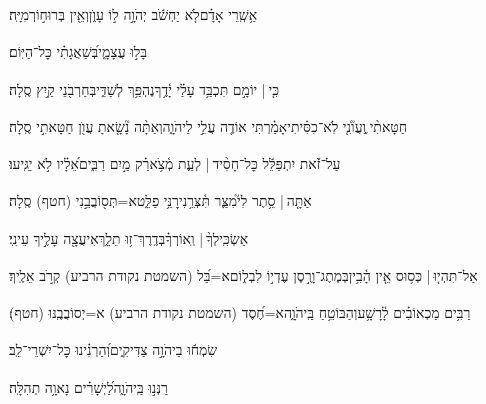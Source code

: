 \documentclass[12pt]{article}
\newcommand{\loc}[1]{\textsuperscript{\locf{#1}}}
\begin{document}
{\loc{ ב}~}‏אַ֥שְֽׁרֵי אָדָ֗ם{\hfill}לֹ֤א יַחְשֹׁ֬ב יְהֹוָ֣ה ל֣וֹ עָוֺ֑ן\newline\hspace*{.5em}וְאֵ֖ין בְּרוּח֣וֹ{\hfill}רְמִיָּֽה׃\par

{\loc{ ג}~}‏ בָּל֣וּ עֲצָמָ֑י{\hfill}בְּ֝שַׁאֲגָתִ֗י כׇּל־הַיּֽוֹם׃\par

{\loc{ ד}~}‏כִּ֤י |  יוֹמָ֣ם {\hfill}תִּכְבַּ֥ד עָלַ֗י יָ֫דֶ֥ךָ\newline\hspace*{.5em}נֶהְפַּ֥ךְ לְשַׁדִּ֑י{\hfill}בְּחַרְבֹ֖נֵי קַ֣יִץ סֶֽלָה׃\par

{\loc{ ה}~}‏חַטָּאתִ֨י ֪{\hfill}וַעֲוֺ֘נִ֤י לֹֽא־כִסִּ֗יתִי\newline\hspace*{.5em}אָמַ֗רְתִּי אוֹדֶ֤ה עֲלֵ֣י  לַיהֹוָ֑ה{\hfill}וְאַתָּ֨ה נָ֘שָׂ֤אתָ עֲוֺ֖ן חַטָּאתִ֣י סֶֽלָה׃\par

{\loc{ ו}~}‏עַל־זֹ֡את יִתְפַּלֵּ֬ל כׇּל־חָסִ֨יד |  {\hfill}לְעֵ֢ת מְ֫צֹ֥א\newline\hspace*{.5em}רַ֗ק  מַ֣יִם רַבִּ֑ים{\hfill}אֵ֝לָ֗יו לֹ֣א יַגִּֽיעוּ׃\par

{\loc{ ז}~}‏אַתָּ֤ה |  סֵ֥תֶר לִי֮{\hfill}מִצַּ֢ר תִּ֫צְּרֵ֥נִי\newline\hspace*{.5em}רׇנֵּ֥י פַלֵּ֑ט{\hfill}א=תְּס֖וֹבֲבֵ֣נִי (חטף) סֶֽלָה׃\par

{\loc{ ח}~}‏אַשְׂכִּֽילְךָ֨ | {\hfill}וְֽאוֹרְךָ֗\newline\hspace*{.5em}בְּדֶֽרֶךְ־ז֥וּ תֵלֵ֑ךְ{\hfill}אִיעֲצָ֖ה עָלֶ֣יךָ עֵינִֽי׃\par

{\loc{ ט}~}‏אַל־תִּהְי֤וּ |  כְּס֥וּס {\hfill}אֵ֤ין הָ֫בִ֥ין\newline\hspace*{.5em}בְּמֶתֶג־וָרֶ֣סֶן עֶדְי֣וֹ לִבְל֑וֹם{\hfill}א=בַּ֝ל (השמטת נקודת הרביע) קְרֹ֣ב אֵלֶֽיךָ׃\par

{\loc{ י}~}‏רַבִּ֥ים מַכְאוֹבִ֗ים לָ֫רָשָׁ֥ע{\hfill}וְהַבּוֹטֵ֥חַ בַּֽיהֹוָ֑ה{\hfill}א=חֶ֝סֶד (השמטת נקודת הרביע) א=יְסוֹבֲבֶֽנּוּ (חטף)׃\par

{\loc{ יא}~}‏שִׂמְח֬וּ בַיהֹוָ֣ה  צַדִּיקִ֑ים{\hfill}וְ֝הַרְנִ֗ינוּ כׇּל־יִשְׁרֵי־לֵֽב׃\par\pend
\ledpb
\pstart[\subsection*{\textcolor{red}{פרק לג}}]\label{פרק לג}
{\loc{ א}~}‏רַנְּנ֣וּ  בַּֽיהֹוָ֑ה{\hfill}לַ֝יְשָׁרִ֗ים נָאוָ֥ה תְהִלָּֽה׃\par
\end{document}
